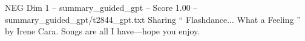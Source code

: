 \begin{textsample}{NEG Dim 1 – summary\_guided\_gpt – Score 1.00 – summary\_guided\_gpt/t2844\_gpt.txt}  \label{ex:f1_neg_021}
Sharing “ Flashdance...
What a Feeling ” by Irene Cara.
Songs are all I have—hope you enjoy.

\end{textsample}
